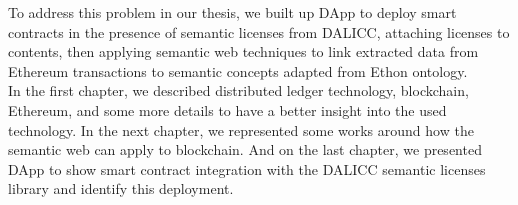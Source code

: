 To address this problem in our thesis, we built up DApp to deploy smart contracts in the presence of semantic licenses from DALICC, attaching licenses to contents, then applying semantic web techniques to link extracted data from Ethereum transactions to semantic concepts adapted from Ethon ontology. \\
In the first chapter, we described distributed ledger technology, blockchain, Ethereum, and some more details to have a better insight into the used technology. In the next chapter, we represented some works around how the semantic web can apply to blockchain. And on the last chapter, we presented DApp to show smart contract integration with the DALICC semantic licenses library and identify this deployment.
